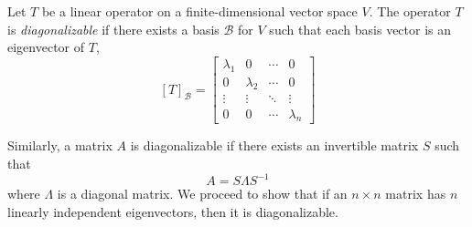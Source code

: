 \begin{definition}
Let $T$ be a linear operator on a finite-dimensional vector space $V$.
The operator $T$ is \emph{diagonalizable} if there exists a basis $\mathcal{B}$ for $V$ such that each basis vector is an eigenvector of $T$,
\begin{equation*}
\left[ T \right]_{\mathcal{B}}
= \left[ \begin{array}{cccc}
\lambda_1 & 0 & \cdots & 0 \\
0 & \lambda_2 & \cdots & 0 \\
\vdots & \vdots & \ddots & \vdots \\
0 & 0 & \cdots & \lambda_n
\end{array} \right]
\end{equation*}
\end{definition}

Similarly, a matrix $A$ is diagonalizable if there exists an invertible matrix $S$ such that
\begin{equation*}
A = S \Lambda S^{-1}
\end{equation*}
where $\Lambda$ is a diagonal matrix.
We proceed to show that if an $n \times n$ matrix has $n$ linearly independent eigenvectors, then it is diagonalizable.

